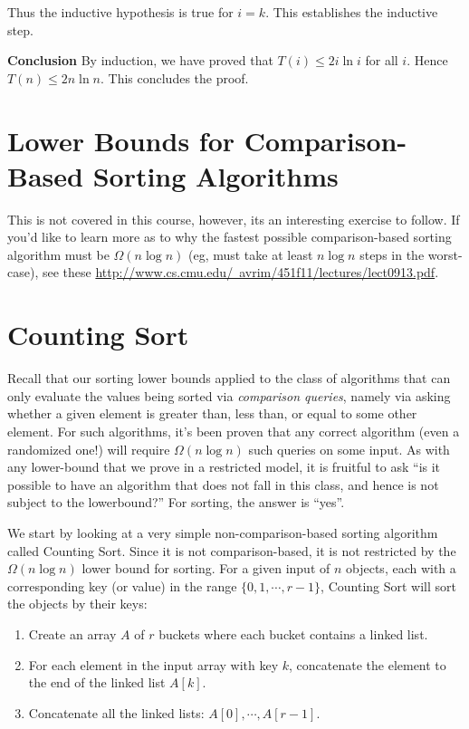 \documentclass [12pt]{article}
\begin{document}
Thus the inductive hypothesis is true for $i = k$. This establishes the inductive step.

\textbf{Conclusion} By induction, we have proved that $T(i) \leq 2i \ln i$ for all $i$. Hence $T(n) \leq
2n \ln n$. This concludes the proof.

\section{Lower Bounds for Comparison-Based Sorting Algorithms}

This is not covered in this course, however, its an interesting exercise to follow. If you'd like to learn more as to why the fastest possible comparison-based sorting algorithm must be $\Omega(n \log n)$ (eg, must take at least $n \log n$ steps in the worst-case), see these \href{notes}{http://www.cs.cmu.edu/~avrim/451f11/lectures/lect0913.pdf}.

\section{Counting Sort} 
Recall that our sorting lower bounds applied to the class of algorithms that can only evaluate the values being sorted via \textit{comparison queries}, namely via asking whether a given element is greater than, less than, or equal to some other element. For such algorithms, it's been proven that any correct algorithm (even a randomized one!) will require $\Omega(n \log n)$ such queries on some input. As with any lower-bound that we prove in a restricted model, it is fruitful to ask ``is it possible to have an algorithm that does not fall in this class, and hence is not subject to the lowerbound?'' For sorting, the answer is ``yes''.

We start by looking at a very simple non-comparison-based sorting algorithm called Counting Sort. Since it is not comparison-based, it is not restricted by the $\Omega(n \log n)$ lower bound for sorting. For a given input of $n$ objects, each with a corresponding key (or value) in the range $\{0, 1, \cdots, r - 1\}$, Counting Sort will sort the objects by their keys: 

\begin{enumerate}
  \item Create an array $A$ of $r$ buckets where each bucket contains a linked list. 
  \item For each element in the input array with key $k$, concatenate the element to the end of the linked list $A[k]$. 
  \item Concatenate all the linked lists: $A[0], \cdots , A[r - 1]$.
\end{enumerate}
\end{document}
